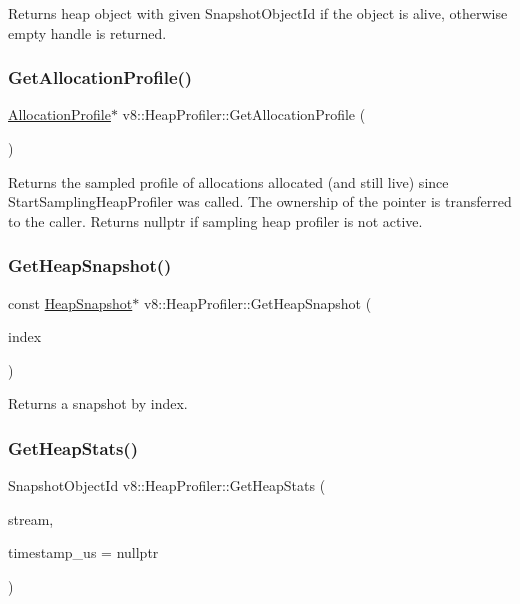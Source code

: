Returns heap object with given Snapshot\+Object\+Id if the object is alive, otherwise empty handle is returned. \mbox{\label{classv8_1_1HeapProfiler_aaadb22168da6a2889796ed3b5638cd50}} 
\subsubsection{\texorpdfstring{Get\+Allocation\+Profile()}{GetAllocationProfile()}}
{\footnotesize\ttfamily \mbox{\hyperlink{classv8_1_1AllocationProfile}{Allocation\+Profile}}$\ast$ v8\+::\+Heap\+Profiler\+::\+Get\+Allocation\+Profile (\begin{DoxyParamCaption}{ }\end{DoxyParamCaption})}

Returns the sampled profile of allocations allocated (and still live) since Start\+Sampling\+Heap\+Profiler was called. The ownership of the pointer is transferred to the caller. Returns nullptr if sampling heap profiler is not active. \mbox{\label{classv8_1_1HeapProfiler_af9093f6ca6e5558315f354c7ccb55484}} 
\subsubsection{\texorpdfstring{Get\+Heap\+Snapshot()}{GetHeapSnapshot()}}
{\footnotesize\ttfamily const \mbox{\hyperlink{classv8_1_1HeapSnapshot}{Heap\+Snapshot}}$\ast$ v8\+::\+Heap\+Profiler\+::\+Get\+Heap\+Snapshot (\begin{DoxyParamCaption}\item[{int}]{index }\end{DoxyParamCaption})}

Returns a snapshot by index. \mbox{\label{classv8_1_1HeapProfiler_add093717acd067daeddb7ef5fc8b191a}} 
\subsubsection{\texorpdfstring{Get\+Heap\+Stats()}{GetHeapStats()}}
{\footnotesize\ttfamily Snapshot\+Object\+Id v8\+::\+Heap\+Profiler\+::\+Get\+Heap\+Stats (\begin{DoxyParamCaption}\item[{\mbox{\hyperlink{classv8_1_1OutputStream}{Output\+Stream}} $\ast$}]{stream,  }\item[{int64\+\_\+t $\ast$}]{timestamp\+\_\+us = {\ttfamily nullptr} }\end{DoxyParamCaption})}

